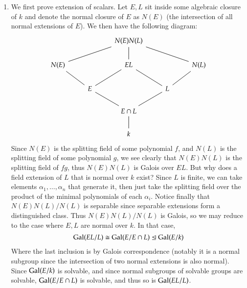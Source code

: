 \documentclass[12pt]{article}
\theoremstyle{definitionstyle}
\newcommand{\nsg}{\trianglelefteq}
\newcommand{\Gal}{\mathrm{Gal}\qty}
\begin{document}
\begin{enumerate}[leftmargin=\labelsep]
		\item We first prove extension of scalars. Let $E, L$ sit inside some algebraic closure of $k$ and denote the normal closure of $E$ as $N(E)$ (the intersection of all normal extensions of $E$). We then have the following diagram:
		\[\begin{tikzcd}
			&& {N(E)N(L)} \\
			{N(E)} && EL && {N(L)} \\
			& E && L \\
			&& {E \cap L} \\
			&& k
			\arrow[no head, from=4-3, to=5-3]
			\arrow[no head, from=4-3, to=3-2]
			\arrow[no head, from=4-3, to=3-4]
			\arrow[no head, from=3-2, to=2-3]
			\arrow[no head, from=2-3, to=3-4]
			\arrow[no head, from=3-2, to=2-1]
			\arrow[no head, from=3-4, to=2-5]
			\arrow[no head, from=2-1, to=1-3]
			\arrow[no head, from=1-3, to=2-5]
			\arrow[no head, from=2-3, to=1-3]
		\end{tikzcd}\]
		Since $N(E)$ is the splitting field of some polynomial $f$, and $N(L)$ is the splitting field of some polynomial $g$, we see clearly that $N(E)N(L)$ is the splitting field of $fg$, thus $N(E)N(L)$ is Galois over $EL$. But why does a field extension of $L$ that is normal over $k$ exist? Since $L$ is finite, we can take elements $\alpha_1, \ldots, \alpha_n$ that generate it, then just take the splitting field over the product of the minimal polynomials of each $\alpha_i$. Notice finally that $N(E)N(L) / N(L)$ is separable since separable extensions form a distinguished class. Thus $N(E)N(L)/N(L)$ is Galois, so we may reduce to the case where $E, L$ are normal over $k$. In that case,
		\begin{align*}
			\Gal(EL/L) \cong \Gal(E/E \cap L) \nsg \Gal(E/k)
		\end{align*}
		Where the last inclusion is by Galois correspondence (notably it is a normal subgroup since the intersection of two normal extensions is also normal). Since $\Gal(E/k)$ is solvable, and since normal subgroups of solvable groups are solvable, $\Gal(E/E \cap L)$ is solvable, and thus so is $\Gal(EL/L)$.
		

\end{enumerate}
\end{document}
